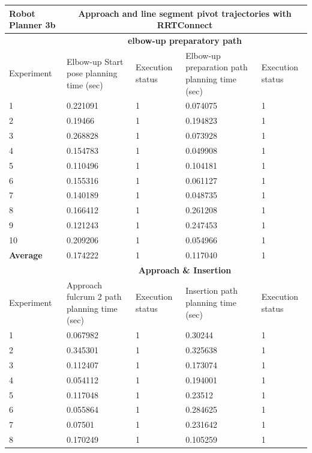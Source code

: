 \begin{longtable}{|p{}|p{}|p{}|p{}|p{}|}
\hline
Robot Planner 3b          & \multicolumn{4}{c}{Approach and \textbf{line segment pivot} trajectories with \textbf{RRTConnect}}                                                                                                 \vline \\
\hline
                          & \multicolumn{4}{c}{\textbf{elbow-up preparatory path}}                     \vline \\
\hline
Experiment                & Elbow-up Start pose planning time (sec) & Execution status & Elbow-up preparation path planning time (sec) & Execution status  \\
\hline
1 & 0.221091 & 1 & 0.074075 & 1 \\
2 & 0.19466 & 1 & 0.194823 & 1 \\
3 & 0.268828 & 1 & 0.073928 & 1 \\
4 & 0.154783 & 1 & 0.049908 & 1 \\
5 & 0.110496 & 1 & 0.104181 & 1 \\
6 & 0.155316 & 1 & 0.061127 & 1 \\
7 & 0.140189 & 1 & 0.048735 & 1 \\
8 & 0.166412 & 1 & 0.261208 & 1 \\
9 & 0.121243 & 1 & 0.247453 & 1 \\
10 & 0.209206 & 1 & 0.054966 & 1 \\
\hline
\textbf{Average} & 0.174222 & 1 & 0.117040	& 1 \\
\hline
                          & \multicolumn{4}{c}{\textbf{Approach \& Insertion}}                     \vline \\
\hline
Experiment                & Approach fulcrum 2 path planning time (sec) & Execution status & Insertion path planning time (sec) & Execution status  \\
\hline
1 & 0.067982 & 1 & 0.30244 & 1 \\
2 & 0.345301 & 1 & 0.325638 & 1 \\
3 & 0.112407 & 1 & 0.173074 & 1 \\
4 & 0.054112 & 1 & 0.194001 & 1 \\
5 & 0.117048 & 1 & 0.23512 & 1 \\
6 & 0.055864 & 1 & 0.284625 & 1 \\
7 & 0.07501 & 1 & 0.231642 & 1 \\
8 & 0.170249 & 1 & 0.105259 & 1 \\

\end{longtable}

